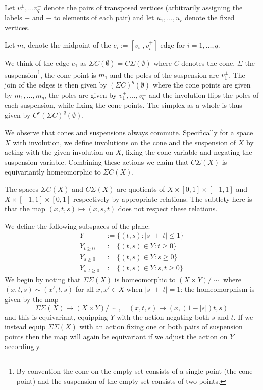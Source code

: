 \documentclass[11pt,a4paper]{article}
\def\suspcone{Y_{t\geq0}}
\def\conesusp{Y_{s\geq0}}
\def\conecone{Y_{s,t\geq0}}
\def\suspsusp{Y}
\begin{document}
Let $v_1^\pm,\dots v_q^\pm$ denote the pairs of transposed vertices (arbitrarily assigning the labels $+$ and $-$ to elements of each pair) and let $u_1,\dots,u_r$ denote the fixed vertices.

Let $m_i$ denote the midpoint of the $e_i:=[v_i^-,v_i^+]$ edge for $i=1,\dots, q$.



We think of the edge $e_1$ as $\Sigma C(\emptyset)=C\Sigma (\emptyset)$ where $C$ denotes the cone, $\Sigma$ the suspension\footnote{By convention the cone on the empty set consists of a single point (the cone point) and the suspension of the empty set consists of two points.}, the cone point is $m_1$ and the poles of the suspension are $v_1^\pm$. The join of the edges is then given by $(\Sigma C)^q(\emptyset)$ where the cone points are given by $m_1,\dots, m_q$, the poles are given by $v_1^\pm,\dots,v_q^\pm$ and the involution flips the poles of each suspension, while fixing the cone points. The simplex as a whole is thus given by $C^r(\Sigma C)^q(\emptyset)$.

We observe that cones and suspensions always commute.  Specifically for a space $X$ with involution, we define involutions on the cone and the suspension of $X$ by acting with the given involution on $X$, fixing the cone variable and negating the suspension variable.  Combining these actions we claim that $C\Sigma(X)$ is equivariantly homeomorphic to $\Sigma C(X)$.

The spaces  $\Sigma C(X)$ and $C\Sigma(X)$ are quotients of $X\times [0,1]\times [-1,1]$ and $X\times [-1,1]\times [0,1]$ respectively by appropriate relations.  The subtlety here is that the map $(x,t,s)\mapsto (x,s,t)$ does not respect these relations.

We define the following subspaces of the plane:
\begin{align*}
    \suspsusp&:=\{(t,s) : |s|+|t|\leq 1\}\\
    \suspcone&:=\{(t,s) \in \suspsusp : t\geq 0\}\\
    \conesusp&:=\{(t,s) \in \suspsusp: s\geq 0\}\\
    \conecone&:=\{(t,s) \in \suspsusp: s,t\geq 0\}
\end{align*}
We begin by noting that $\Sigma\Sigma(X)$ is homeomorphic to $(X\times \suspsusp)/\sim$ where $(x,t,s)\sim (x',t,s)$ for all $x,x'\in X$ when $|s|+|t|=1$: the homeomorphism is given by the map
\[
\Sigma \Sigma(X)\to (X\times \suspsusp)/\sim,\quad (x,t,s)\mapsto (x,(1-|s|)t,s)
\]
and this is equivariant, equipping $\suspsusp$ with the action negating both $s$ and $t$.  If we instead equip $\Sigma \Sigma(X)$ with an action fixing one or both pairs of suspension points then the map will again be equivariant if we adjust the action on $\suspsusp$ accordingly.
\end{document}
